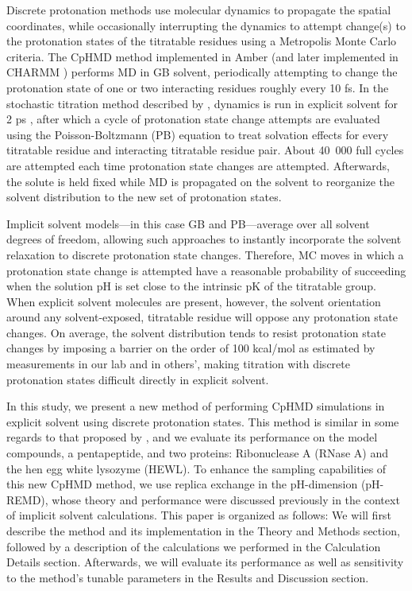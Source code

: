 Discrete protonation methods use molecular dynamics to propagate the spatial
coordinates, while occasionally interrupting the dynamics to attempt change(s)
to the protonation states of the titratable residues using a Metropolis Monte
Carlo criteria. The CpHMD method implemented in Amber
\cite{Mongan_JComputChem_2004_v25_p2038} (and later implemented in CHARMM
\cite{Itoh_Proteins_2011_v79_p3420}) performs MD in GB solvent, periodically
attempting to change the protonation state of one or two interacting residues
roughly every 10 fs. \cite{Mongan_JComputChem_2004_v25_p2038} In the stochastic
titration method described by \citeauthor{Baptista_JChemPhys_2002_v117_p4184},
dynamics is run in explicit solvent for 2 ps
\cite{Machuqueiro_Proteins_2008_v72_p289}, after which a cycle of protonation
state change attempts are evaluated using the Poisson-Boltzmann (PB) equation to
treat solvation effects for every titratable residue and interacting titratable
residue pair.  About \mbox{40 000} full cycles are attempted each time
protonation state changes are attempted.
\cite{Baptista_JPhysChemB_2001_v105_p293} Afterwards, the solute is held fixed
while MD is propagated on the solvent to reorganize the solvent distribution to
the new set of protonation states.

Implicit solvent models---in this case GB and PB---average over all solvent
degrees of freedom, allowing such approaches to instantly incorporate the
solvent relaxation to discrete protonation state changes. Therefore, MC moves in
which a protonation state change is attempted have a reasonable probability of
succeeding when the solution pH is set close to the intrinsic pK of the
titratable group. When explicit solvent molecules are present, however, the
solvent orientation around any solvent-exposed, titratable residue will oppose
any protonation state changes. On average, the solvent distribution tends to
resist protonation state changes by imposing a barrier on the order of 100
kcal/mol as estimated by measurements in our lab and in others',
\cite{Wallace_JChemTheoryComput_2011_v7_p2617} making titration with discrete
protonation states difficult directly in explicit solvent.

In this study, we present a new method of performing CpHMD simulations in
explicit solvent using discrete protonation states.  This method is similar 
in some regards to that proposed by
\citeauthor{Baptista_JChemPhys_2002_v117_p4184},
\cite{Baptista_JChemPhys_2002_v117_p4184} and we evaluate its performance on
the model compounds, a pentapeptide, and two proteins: Ribonuclease A (RNase A)
and the hen egg white lysozyme (HEWL). To enhance the sampling capabilities of
this new CpHMD method, we use replica exchange in the pH-dimension (pH-REMD),
whose theory and performance were discussed previously in the context of
implicit solvent calculations.  \cite{Itoh_Proteins_2011_v79_p3420,
Swails_JChemTheoryComput_2012_v8_p4393} This paper is organized as follows: We
will first describe the method and its implementation in the Theory and Methods
section, followed by a description of the calculations we performed in the
Calculation Details section. Afterwards, we will evaluate its performance as
well as sensitivity to the method's tunable parameters in the Results and
Discussion section.

